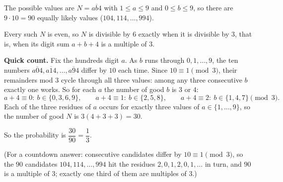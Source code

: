 The possible values are $N=\overline{ab4}$ with $1\le a\le9$ and $0\le b\le9$, so there are $9\cdot10=90$ equally likely values ($104,114,\dots,994$).

Every such $N$ is even, so $N$ is divisible by $6$ exactly when it is divisible by $3$, that is, when its digit sum $a+b+4$ is a multiple of $3$.

\textbf{Quick count.} Fix the hundreds digit $a$. As $b$ runs through $0,1,\dots,9$, the ten numbers $\overline{a04},\overline{a14},\dots,\overline{a94}$ differ by $10$ each time. Since $10\equiv1\pmod 3$, their remainders mod $3$ cycle through all three values: among any three consecutive $b$ exactly one works. So for each $a$ the number of good $b$ is $3$ or $4$:
\[
a+4\equiv0:\ b\in\{0,3,6,9\},\qquad a+4\equiv1:\ b\in\{2,5,8\},\qquad a+4\equiv2:\ b\in\{1,4,7\}\pmod 3 .
\]
Each of the three residues of $a$ occurs for exactly three values of $a\in\{1,\dots,9\}$, so the number of good $N$ is $3(4+3+3)=30$.

So the probability is $\dfrac{30}{90}=\boxed{\dfrac{1}{3}}$.

(For a countdown answer: consecutive candidates differ by $10\equiv1\pmod3$, so the $90$ candidates $104,114,\dots,994$ hit the residues $2,0,1,2,0,1,\dots$ in turn, and $90$ is a multiple of $3$; exactly one third of them are multiples of $3$.)
